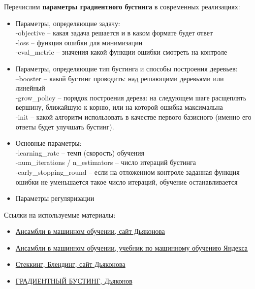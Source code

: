 Перечислим \textbf{параметры градиентного бустинга} в современных реализациях:
\begin{itemize}
    \item Параметры, определяющие задачу: \\
        -objective – какая задача решается и в каком формате будет ответ \\
        -loss – функция ошибки для минимизации \\
        -eval\_metric – значения какой функции ошибки смотреть на контроле \\
    \item Параметры, определяющие тип бустинга и способы построения деревьев: \\
    --booster – какой бустинг проводить: над решающими деревьями или линейный \\
    -grow\_policy – порядок построения дерева: на следующем шаге расщеплять вершину, ближайшую к корню, или на которой ошибка максимальна\\
    -init – какой алгоритм использовать в качестве первого базисного (именно его ответы будет улучшать бустинг). 
    \item Основные параметры: \\
    -learning\_rate – темп (скорость) обучения \\
    -num\_iterations / n\_estimators  – число итераций бустинга \\
    -early\_stopping\_round  –  если на отложенном контроле заданная функция ошибки не уменьшается такое число итераций, обучение останавливается
    \item Параметры регуляризации
    
    
\end{itemize}


Ссылки на используемые материалы:
\begin{itemize}
    \item \href{https://alexanderdyakonov.wordpress.com/2019/04/19/%D0%B0%D0%BD%D1%81%D0%B0%D0%BC%D0%B1%D0%BB%D0%B8-%D0%B2-%D0%BC%D0%B0%D1%88%D0%B8%D0%BD%D0%BD%D0%BE%D0%BC-%D0%BE%D0%B1%D1%83%D1%87%D0%B5%D0%BD%D0%B8%D0%B8}{Ансамбли в машинном обучении, сайт Дьяконова}
    \item \href{https://academy.yandex.ru/handbook/ml/article/ansambli-v-mashinnom-obuchenii}{Ансамбли в машинном обучении, учебник по машинному обучению Яндекса}
    \item \href{https://alexanderdyakonov.wordpress.com/2017/03/10/c%d1%82%d0%b5%d0%ba%d0%b8%d0%bd%d0%b3-stacking-%d0%b8-%d0%b1%d0%bb%d0%b5%d0%bd%d0%b4%d0%b8%d0%bd%d0%b3-blending/}{Стеккинг, Блендинг, сайт Дьяконова}
    \item \href{http://dyakonov.org/2017/06/09/%d0%b3%d1%80%d0%b0%d0%b4%d0%b8%d0%b5%d0%bd%d1%82%d0%bd%d1%8b%d0%b9-%d0%b1%d1%83%d1%81%d1%82%d0%b8%d0%bd%d0%b3/}{ГРАДИЕНТНЫЙ БУСТИНГ, Дьяконов}
\end{itemize}


